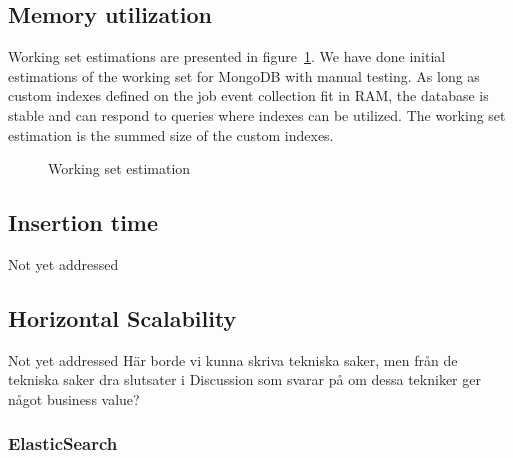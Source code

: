 \subsection{Memory utilization}
Working set estimations are presented in figure~\ref{fig:ws}. We have done initial estimations of the working set for MongoDB with manual testing. As long as custom indexes defined on the job event collection fit in RAM, the database is stable and can respond to queries where indexes can be utilized. The working set estimation is the summed size of the custom indexes.
\begin{figure}[h!]
\centering
{}
\caption{Working set estimation}
\label{fig:ws}
\end{figure}
\subsection{Insertion time}
Not yet addressed
\subsection{Horizontal Scalability}
Not yet addressed
Här borde vi kunna skriva tekniska saker, men från de tekniska saker dra slutsater i Discussion som svarar på om dessa tekniker ger något business value?
\subsubsection{ElasticSearch}







